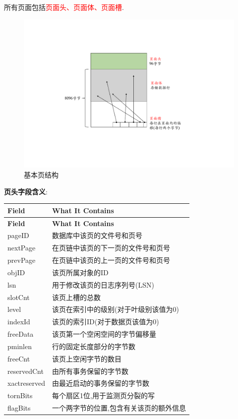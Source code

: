 所有页面包括\textcolor{red}{页面头、页面体、页面槽}.

\begin{figure}[H]
    \centering
    \includegraphics[width=.6\textwidth]{figure/基本页结构.pdf}
    \caption{基本页结构}
\end{figure}

\textbf{页头字段含义}:

\begin{longtable}{|p{3cm}|p{10cm}|}
\hline
\textbf{Field} & \textbf{What It Contains} \\
\hline
\endfirsthead

\hline
\textbf{Field} & \textbf{What It Contains} \\
\hline
\endhead

pageID & 数据库中该页的文件号和页号 \\
\hline
nextPage & 在页链中该页的下一页的文件号和页号 \\
\hline
prevPage & 在页链中该页的上一页的文件号和页号 \\
\hline
objID & 该页所属对象的ID \\
\hline
lsn & 用于修改该页的日志序列号(LSN) \\
\hline
slotCnt & 该页上槽的总数 \\
\hline
level & 该页在索引中的级别(对于叶级别该值为0) \\
\hline
indexId & 该页的索引ID(对于数据页该值为0) \\
\hline
freeData & 该页第一个空闲空间的字节偏移量 \\
\hline
pminlen & 行的固定长度部分的字节数 \\
\hline
freeCnt & 该页上空闲字节的数目 \\
\hline
reservedCnt & 由所有事务保留的字节数 \\
\hline
xactreserved & 由最近启动的事务保留的字节数 \\
\hline
tornBits & 每个扇区1位,用于监测页分裂的写 \\
\hline
flagBits & 一个两字节的位置,包含有关该页的额外信息 \\
\hline

\end{longtable}

